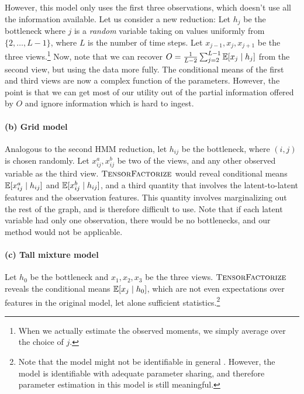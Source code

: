 However, this model only uses the first three observations,
which doesn't use all the information available.
Let us consider a new reduction:
Let $h_j$ be the bottleneck where $j$ is a \emph{random} variable
taking on values uniformly from $\{2,
\dots, L-1\}$, where $L$ is the number of time steps.
Let $x_{j-1},x_j,x_{j+1}$ be the three views.\footnote{
When we actually estimate the observed moments, we simply average over the choice of $j$.}
Now, note that we can recover $O = \frac{1}{L-2} \sum_{j=2}^{L-1} \mathbb{E}[x_j \mid h_j]$ from the second view,
but using the data more fully.  The conditional means of the first and third
views are now a complex function of the parameters.
However, the point is that we can get most of our utility out of the partial
information offered by $O$ and ignore information which is hard to ingest.

\paragraph{(b) Grid model}
Analogous to the second HMM reduction, let $h_{ij}$ be the bottleneck,
where $(i,j)$ is chosen randomly.
Let $x_{ij}^a,x_{ij}^b$ be two of the views, and any other observed variable as the third view.
$\text{\sc TensorFactorize}$ would reveal conditional means $\mathbb{E}[x_{ij}^a \mid h_{ij}]$
and $\mathbb{E}[x_{ij}^b \mid h_{ij}]$,
and a third quantity that involves the latent-to-latent features and the observation features.
This quantity involves marginalizing out the rest of the graph,
and is therefore difficult to use.
Note that if each latent variable had only one observation,
there would be no bottlenecks, and our method would not be applicable.

\paragraph{(c) Tall mixture model}
Let $h_0$ be the bottleneck and $x_1,x_2,x_3$ be the three
views.
$\text{\sc TensorFactorize}$ reveals the conditional means $\mathbb{E}[x_j \mid h_0]$, which are
not even expectations over features in the original model, let alone sufficient
statistics.\footnote{Note that
the model might not be identifiable in general \cite{anandkumar11tree}.
However, the model is identifiable with adequate parameter sharing,
and therefore
parameter estimation in this model is still meaningful.}

